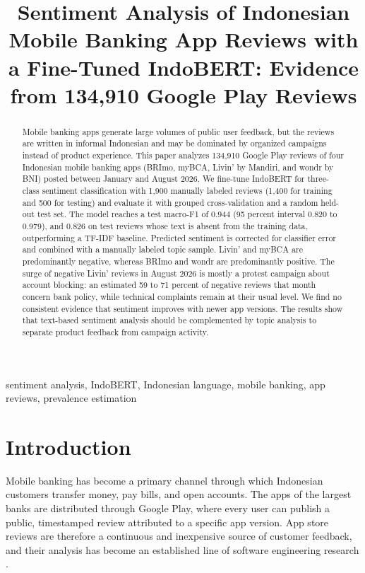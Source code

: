 \documentclass[conference]{IEEEtran}
\begin{document}
\title{Sentiment Analysis of Indonesian Mobile Banking App Reviews with a Fine-Tuned IndoBERT: Evidence from 134,910 Google Play Reviews}

\author{
}

\maketitle

\begin{abstract}
Mobile banking apps generate large volumes of public user feedback, but the reviews are written in informal Indonesian and may be dominated by organized campaigns instead of product experience. This paper analyzes 134,910 Google Play reviews of four Indonesian mobile banking apps (BRImo, myBCA, Livin' by Mandiri, and wondr by BNI) posted between January and August 2026. We fine-tune IndoBERT for three-class sentiment classification with 1,900 manually labeled reviews (1,400 for training and 500 for testing) and evaluate it with grouped cross-validation and a random held-out test set. The model reaches a test macro-F1 of 0.944 (95 percent interval 0.820 to 0.979), and 0.826 on test reviews whose text is absent from the training data, outperforming a TF-IDF baseline. Predicted sentiment is corrected for classifier error and combined with a manually labeled topic sample. Livin' and myBCA are predominantly negative, whereas BRImo and wondr are predominantly positive. The surge of negative Livin' reviews in August 2026 is mostly a protest campaign about account blocking: an estimated 59 to 71 percent of negative reviews that month concern bank policy, while technical complaints remain at their usual level. We find no consistent evidence that sentiment improves with newer app versions. The results show that text-based sentiment analysis should be complemented by topic analysis to separate product feedback from campaign activity.
\end{abstract}

\begin{IEEEkeywords}
sentiment analysis, IndoBERT, Indonesian language, mobile banking, app reviews, prevalence estimation
\end{IEEEkeywords}

\section{Introduction}
Mobile banking has become a primary channel through which Indonesian customers transfer money, pay bills, and open accounts. The apps of the largest banks are distributed through Google Play, where every user can publish a public, timestamped review attributed to a specific app version. App store reviews are therefore a continuous and inexpensive source of customer feedback, and their analysis has become an established line of software engineering research \cite{b1,b2}.
\end{document}
